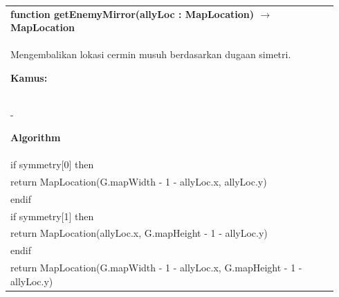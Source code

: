 \documentclass{article}
\newenvironment{pseudobox}
{
\centering
\begin{longtable}{|p{0.94\linewidth}|}
\hline
}
{
\\ \hline
\end{longtable}
\vspace{0.05cm}
}
\begin{document}
\begin{pseudobox}
\textbf{function getEnemyMirror(allyLoc : MapLocation) $\rightarrow$ MapLocation} \\
{ Mengembalikan lokasi cermin musuh berdasarkan dugaan simetri. }

\textbf{Kamus:} \\
\hspace*{1em} -

\textbf{Algorithm} \\
\hspace*{1em} if symmetry[0] then \\
\hspace*{2em} return MapLocation(G.mapWidth - 1 - allyLoc.x, allyLoc.y) \\
\hspace*{1em} endif \\

\hspace*{1em} if symmetry[1] then \\
\hspace*{2em} return MapLocation(allyLoc.x, G.mapHeight - 1 - allyLoc.y) \\
\hspace*{1em} endif \\

\hspace*{1em} return MapLocation(G.mapWidth - 1 - allyLoc.x, G.mapHeight - 1 - allyLoc.y)
\end{pseudobox}
\end{document}
